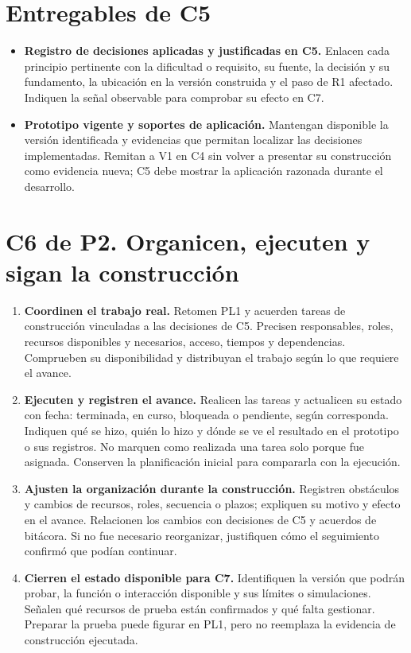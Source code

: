 \section*{Entregables de C5}
\begin{itemize}
\item \textbf{Registro de decisiones aplicadas y justificadas en C5.} Enlacen cada principio pertinente con la dificultad o requisito, su fuente, la decisión y su fundamento, la ubicación en la versión construida y el paso de R1 afectado. Indiquen la señal observable para comprobar su efecto en C7.
\item \textbf{Prototipo vigente y soportes de aplicación.} Mantengan disponible la versión identificada y evidencias que permitan localizar las decisiones implementadas. Remitan a V1 en C4 sin volver a presentar su construcción como evidencia nueva; C5 debe mostrar la aplicación razonada durante el desarrollo.
\end{itemize}

\newpage
\section*{C6 de P2. Organicen, ejecuten y sigan la construcción}
\begin{enumerate}[resume=pasos]
\item \textbf{Coordinen el trabajo real.} Retomen PL1 y acuerden tareas de construcción vinculadas a las decisiones de C5. Precisen responsables, roles, recursos disponibles y necesarios, acceso, tiempos y dependencias. Comprueben su disponibilidad y distribuyan el trabajo según lo que requiere el avance.
\item \textbf{Ejecuten y registren el avance.} Realicen las tareas y actualicen su estado con fecha: terminada, en curso, bloqueada o pendiente, según corresponda. Indiquen qué se hizo, quién lo hizo y dónde se ve el resultado en el prototipo o sus registros. No marquen como realizada una tarea solo porque fue asignada. Conserven la planificación inicial para compararla con la ejecución.
\item \textbf{Ajusten la organización durante la construcción.} Registren obstáculos y cambios de recursos, roles, secuencia o plazos; expliquen su motivo y efecto en el avance. Relacionen los cambios con decisiones de C5 y acuerdos de bitácora. Si no fue necesario reorganizar, justifiquen cómo el seguimiento confirmó que podían continuar.
\item \textbf{Cierren el estado disponible para C7.} Identifiquen la versión que podrán probar, la función o interacción disponible y sus límites o simulaciones. Señalen qué recursos de prueba están confirmados y qué falta gestionar. Preparar la prueba puede figurar en PL1, pero no reemplaza la evidencia de construcción ejecutada.
\end{enumerate}

